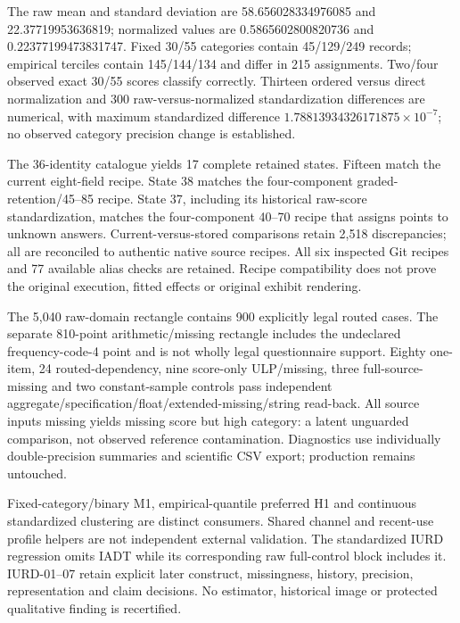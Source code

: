 \documentclass[11pt,a4paper]{article}
\begin{document}
The raw mean and standard deviation are 58.656028334976085 and
22.37719953636819; normalized values are 0.5865602800820736 and
0.22377199473831747. Fixed 30/55 categories contain 45/129/249 records;
empirical terciles contain 145/144/134 and differ in 215 assignments.
Two/four observed exact 30/55 scores classify correctly. Thirteen ordered
versus direct normalization and 300 raw-versus-normalized standardization
differences are numerical, with maximum standardized difference
\(1.78813934326171875\times10^{-7}\); no observed category precision change
is established.

The 36-identity catalogue yields 17 complete retained states.
Fifteen match the current eight-field recipe. State 38 matches the
four-component graded-retention/45--85 recipe. State 37, including its
historical raw-score standardization, matches the four-component 40--70
recipe that assigns points to unknown answers. Current-versus-stored
comparisons retain 2,518 discrepancies; all are reconciled to authentic
native source recipes. All six inspected Git recipes and 77 available
alias checks are retained. Recipe compatibility does not prove the original
execution, fitted effects or original exhibit rendering.

The 5,040 raw-domain rectangle contains 900 explicitly legal routed cases.
The separate 810-point arithmetic/missing rectangle includes the undeclared
frequency-code-4 point and is not wholly legal questionnaire support.
Eighty one-item, 24 routed-dependency, nine score-only ULP/missing, three
full-source-missing and two constant-sample controls pass independent
aggregate/specification/float/extended-missing/string read-back.
All source inputs missing yields missing score but high category: a latent
unguarded comparison, not observed reference contamination.
Diagnostics use individually double-precision summaries and scientific
CSV export; production remains untouched.

Fixed-category/binary M1, empirical-quantile preferred H1 and continuous
standardized clustering are distinct consumers. Shared channel and recent-use
profile helpers are not independent external validation. The standardized
IURD regression omits IADT while its corresponding raw full-control block
includes it. IURD-01--07 retain explicit later construct, missingness,
history, precision, representation and claim decisions. No estimator,
historical image or protected qualitative finding is recertified.
\end{document}

